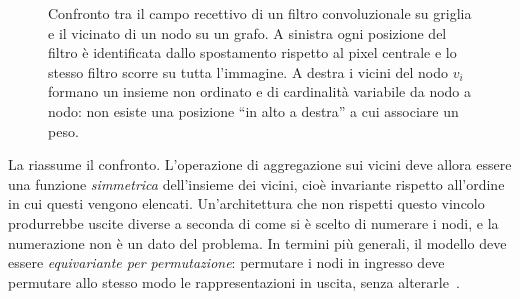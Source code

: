 \begin{figure}[t]
\centering
{}
\caption[Campo recettivo su griglia e vicinato su grafo]{Confronto tra il campo recettivo di un filtro convoluzionale su griglia e il vicinato di un nodo su un grafo. A sinistra ogni posizione del filtro è identificata dallo spostamento rispetto al pixel centrale e lo stesso filtro scorre su tutta l'immagine. A destra i vicini del nodo $v_i$ formano un insieme non ordinato e di cardinalità variabile da nodo a nodo: non esiste una posizione \enquote{in alto a destra} a cui associare un peso.}
\label{fig:grid-vs-graph}
\end{figure}

La  riassume il confronto. L'operazione di aggregazione sui vicini deve allora essere una funzione \emph{simmetrica} dell'insieme dei vicini, cioè invariante rispetto all'ordine in cui questi vengono elencati. Un'architettura che non rispetti questo vincolo produrrebbe uscite diverse a seconda di come si è scelto di numerare i nodi, e la numerazione non è un dato del problema. In termini più generali, il modello deve essere \emph{equivariante per permutazione}: permutare i nodi in ingresso deve permutare allo stesso modo le rappresentazioni in uscita, senza alterarle~\cite{bronstein2021geometric}.

